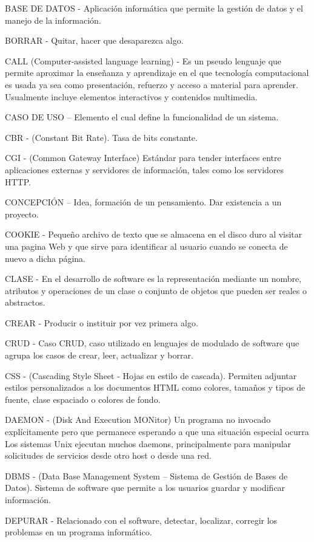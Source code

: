 BASE DE DATOS - Aplicación informática que permite la gestión de datos y el manejo de la información.

BORRAR - Quitar, hacer que desaparezca algo.

CALL (Computer-assisted language learning) - Es un pseudo lenguaje que permite aproximar la enseñanza y aprendizaje en el que tecnología computacional es usada ya sea como presentación, refuerzo y acceso a material para aprender.  Usualmente incluye elementos interactivos y contenidos multimedia.


CASO DE USO – Elemento el cual define la funcionalidad de un sistema.

CBR  -  (Constant Bit Rate). Tasa de bits constante.

CGI - (Common Gateway Interface) Estándar para tender interfaces entre aplicaciones externas y servidores de información, tales como los servidores HTTP.

CONCEPCIÓN – Idea, formación de un pensamiento. Dar existencia a un proyecto.

COOKIE -  Pequeño archivo de texto que se almacena en el disco duro al visitar una pagina Web y que sirve para identificar al usuario cuando se conecta de nuevo a dicha página.

CLASE -  En el desarrollo de software es la representación mediante un nombre, atributos y operaciones de un clase o conjunto de objetos que pueden ser reales o abstractos.

CREAR - Producir o instituir por vez primera algo.

CRUD - Caso CRUD, caso utilizado en lenguajes de modulado de software que agrupa los casos de crear, leer, actualizar y borrar.

CSS -  (Cascading Style Sheet - Hojas en estilo de cascada). Permiten adjuntar estilos personalizados a los documentos HTML como colores, tamaños y tipos de fuente, clase espaciado o colores de fondo.

DAEMON - (Disk And Execution MONitor) Un programa no invocado explícitamente pero que permanece esperando a que una situación especial ocurra  Los sistemas Unix ejecutan muchos daemons, principalmente para manipular solicitudes de servicios desde otro host o desde una red.

DBMS -  (Data Base Management System – Sistema de Gestión de Bases de Datos). Sistema de software que permite a los usuarios guardar y modificar información.

DEPURAR -  Relacionado con el software, detectar, localizar, corregir los problemas en un programa informático.

